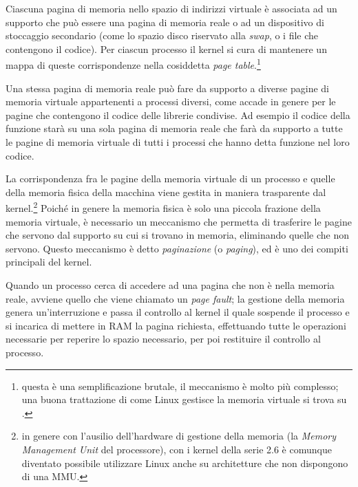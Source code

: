 
Ciascuna pagina di memoria nello spazio di indirizzi virtuale è associata ad
un supporto che può essere una pagina di memoria reale o ad un dispositivo di
stoccaggio secondario (come lo spazio disco riservato alla \textit{swap}, o i
file che contengono il codice). Per ciascun processo il kernel si cura di
mantenere un mappa di queste corrispondenze nella cosiddetta \textit{page
  table}.\footnote{questa è una semplificazione brutale, il meccanismo è molto
  più complesso; una buona trattazione di come Linux gestisce la memoria
  virtuale si trova su \cite{LinVM}.}


Una stessa pagina di memoria reale può fare da supporto a diverse pagine di
memoria virtuale appartenenti a processi diversi, come accade in genere per le
pagine che contengono il codice delle librerie condivise. Ad esempio il codice
della funzione  starà su una sola pagina di memoria reale che
farà da supporto a tutte le pagine di memoria virtuale di tutti i processi che
hanno detta funzione nel loro codice.


La corrispondenza fra le pagine della memoria virtuale di un processo e quelle
della memoria fisica della macchina viene gestita in maniera trasparente dal
kernel.\footnote{in genere con l'ausilio dell'hardware di gestione della
  memoria (la \textit{Memory Management Unit} del processore), con i kernel
  della serie 2.6 è comunque diventato possibile utilizzare Linux anche su
  architetture che non dispongono di una MMU.}  Poiché in genere la memoria
fisica è solo una piccola frazione della memoria virtuale, è necessario un
meccanismo che permetta di trasferire le pagine che servono dal supporto su
cui si trovano in memoria, eliminando quelle che non servono.  Questo
meccanismo è detto \textsl{paginazione} (o \textit{paging}), ed è uno dei
compiti principali del kernel.


Quando un processo cerca di accedere ad una pagina che non è nella memoria
reale, avviene quello che viene chiamato un \textit{page fault}; la gestione
della memoria genera un'interruzione e passa il controllo al kernel il quale
sospende il processo e si incarica di mettere in RAM la pagina richiesta,
effettuando tutte le operazioni necessarie per reperire lo spazio necessario,
per poi restituire il controllo al processo.

